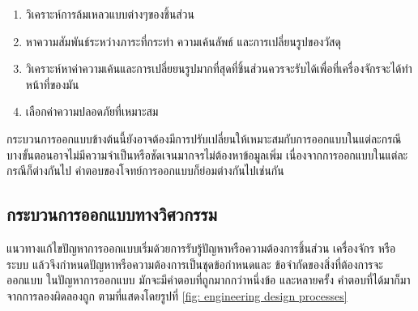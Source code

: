 \documentclass[a4paper,openany,nobib]{tufte-book}
\begin{document}
\begin{enumerate}
\item วิเคราะห์การล้มเหลวแบบต่างๆของชิ้นส่วน
\item หาความสัมพันธ์ระหว่างภาระที่กระทำ ความเค้นลัพธ์ และการเปลี่ยนรูปของวัสดุ
\item วิเคราะห์หาค่าความเค้นและการเปลี่ยยนรูปมากที่สุดที่ชิ้นส่วนควรจะรับได้เพื่อที่เครื่องจักรจะได้ทำหน้าที่ของมัน
\item เลือกค่าความปลอดภัยที่เหมาะสม
\end{enumerate}

กระบวนการออกแบบข้างต้นนี้ยังอาจต้องมีการปรับเปลี่ยนให้เหมาะสมกับการออกแบบในแต่ละกรณี บางขั้นตอนอาจไม่มีความจำเป็นหรือชัดเจนมากจรไม่ต้องหาข้อมูลเพิ่ม เนื่องจากการออกแบบในแต่ละกรณีก็ต่างกันไป คำตอบของโจทย์การออกแบบก็ย่อมต่างกันไปเช่นกัน

\subsection{กระบวนการออกแบบทางวิศวกรรม}
\label{sec:org5d6951d}

แนวทางแก้ไขปัญหาการออกแบบเริ่มด้วยการรับรู้ปัญหาหรือความต้องการชิ้นส่วน เครื่องจักร หรือระบบ แล้วจึงกำหนดปัญหาหรือความต้องการเป็นชุดข้อกำหนดและ
ข้อจำกัดของสิ่งที่ต้องการจะออกแบบ ในปัญหาการออกแบบ มักจะมีคำตอบที่ถูกมากกว่าหนึ่งข้อ และหลายครั้ง คำตอบที่ได้มาก็มาจากการลองผิดลองถูก
ตามที่แสดงโดยรูปที่ \ref{fig: engineering design processes}
\end{document}
